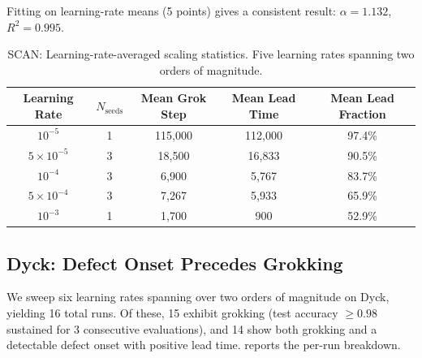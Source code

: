 \documentclass[11pt]{article}
\begin{document}
Fitting on learning-rate means (5 points) gives a consistent result: $\alpha = 1.132$, $R^2 = 0.995$.

\begin{table}[t]
  \centering
  \caption{SCAN: Learning-rate-averaged scaling statistics. Five learning rates spanning two orders of magnitude.}
  \label{tab:scan_lr_means}
  \small
  \begin{tabular}{@{}ccccc@{}}
    \toprule
    Learning Rate & $N_{\text{seeds}}$ & Mean Grok Step & Mean Lead Time & Mean Lead Fraction \\
    \midrule
    $10^{-5}$ & 1 & 115,000 & 112,000 & 97.4\% \\
    $5{\times}10^{-5}$ & 3 & 18,500 & 16,833 & 90.5\% \\
    $10^{-4}$ & 3 & 6,900 & 5,767 & 83.7\% \\
    $5{\times}10^{-4}$ & 3 & 7,267 & 5,933 & 65.9\% \\
    $10^{-3}$ & 1 & 1,700 & 900 & 52.9\% \\
    \bottomrule
  \end{tabular}
\end{table}


\subsection{Dyck: Defect Onset Precedes Grokking}
\label{sec:dyck_results}

We sweep six learning rates spanning over two orders of magnitude on Dyck, yielding 16 total runs. Of these, 15 exhibit grokking (test accuracy $\geq 0.98$ sustained for 3 consecutive evaluations), and 14 show both grokking and a detectable defect onset with positive lead time.  reports the per-run breakdown.
\end{document}
